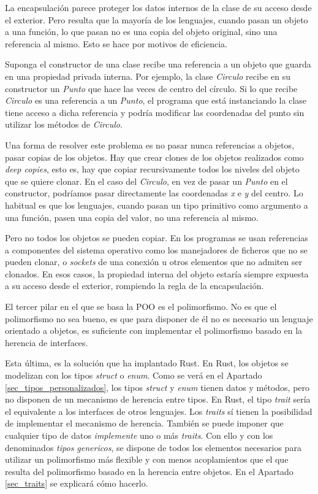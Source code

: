La encapsulación parece proteger los datos internos de la clase de su acceso desde el exterior. Pero resulta que la mayoría de los lenguajes, cuando pasan un objeto a una función, lo que pasan no es una copia del objeto original, sino una referencia al mismo. Esto se hace por motivos de eficiencia. 

Suponga el constructor de una clase recibe una referencia a un objeto que guarda en una propiedad privada interna. Por ejemplo, la clase \textit{Circulo} recibe en su constructor un \textit{Punto} que hace las veces de centro del círculo. Si lo que recibe \textit{Circulo} es una referencia a un \textit{Punto}, el programa que está instanciando la clase tiene acceso a dicha referencia y podría modificar las coordenadas del punto sin utilizar los métodos de \textit{Circulo}. 

Una forma de resolver este problema es no pasar nunca referencias a objetos, pasar copias de los objetos. Hay que crear clones de los objetos realizados como \textit{deep copies}, esto es, hay que copiar recursivamente todos los niveles del objeto que se quiere clonar. En el caso del \textit{Circulo}, en vez de pasar un \textit{Punto} en el constructor, podríamos pasar directamente las coordenadas \textit{x} e \textit{y} del centro. Lo habitual es que los lenguajes, cuando pasan un tipo primitivo como argumento a una función, pasen una copia del valor, no una referencia al mismo. 

Pero no todos los objetos se pueden copiar. En los programas se usan referencias a componentes del sistema operativo como los manejadores de ficheros que no se pueden clonar, o \textit{sockets} de una conexión u otros elementos que no admiten ser clonados. En esos casos, la propiedad interna del objeto estaría siempre expuesta a su acceso desde el exterior, rompiendo la regla de la encapsulación.
 
El tercer pilar en el que se basa la POO es el polimorfismo. No es que el polimorfismo no sea bueno, es que para disponer de él no es necesario un lenguaje orientado a objetos, es suficiente con implementar el polimorfismo basado en la herencia de interfaces. 

Esta última, es la solución que ha implantado Rust. En Rust, los objetos se modelizan con los tipos \textit{struct} o \textit{enum}. Como se verá en el Apartado \ref{sec_tipos_personalizados}, los tipos \textit{struct} y \textit{enum} tienen datos y métodos, pero no disponen de un mecanismo de herencia entre tipos. En Rust, el tipo \textit{trait} sería el equivalente a los interfaces de otros lenguajes. Los \textit{traits} sí tienen la posibilidad de implementar el mecanismo de herencia. También se puede imponer que cualquier tipo de datos \textit{implemente} uno o más \textit{traits}. Con ello y con los denominados \textit{tipos genericos}, se dispone de todos los elementos necesarios para utilizar un polimorfismo más flexible y con menos acoplamientos que el que resulta del polimorfismo basado en la herencia entre objetos. En el Apartado \ref{sec_traits} se explicará cómo hacerlo.

